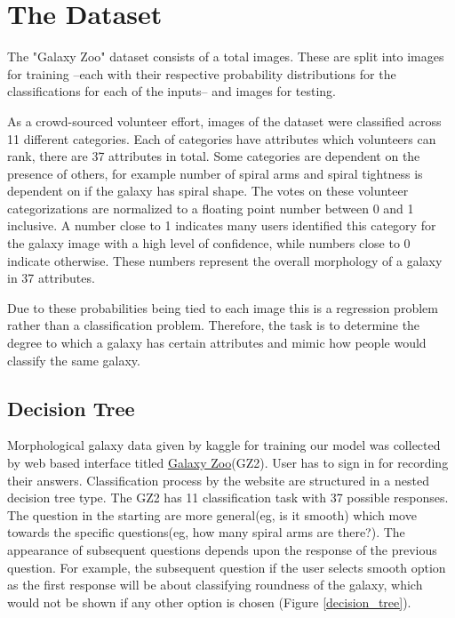 \section{The Dataset}

The "Galaxy Zoo" dataset consists of a total  images. These are split into  images for training --each with their respective probability distributions for the classifications for each of the inputs-- and  images for testing.

As a crowd-sourced volunteer effort, images of the dataset were classified across 11 different categories. Each of categories have attributes which volunteers can rank, there are 37 attributes in total. Some categories are dependent on the presence of others, for example number of spiral arms and spiral tightness is dependent on if the galaxy has spiral shape. The votes on these volunteer categorizations are normalized to a floating point number between 0 and 1 inclusive. A number close to 1 indicates many users identified this category for the galaxy image with a high level of confidence, while numbers close to 0 indicate otherwise. These numbers represent the overall morphology of a galaxy in 37 attributes.

Due to these probabilities being tied to each image this is a regression problem rather than a classification problem. Therefore, the task is to determine the degree to which a galaxy has certain attributes and mimic how people would classify the same galaxy.

\subsection{Decision Tree}

Morphological galaxy data given by kaggle for training our model was collected by web based interface titled \href{https://www.zooniverse.org/projects/zookeeper/galaxy-zoo/classify}{Galaxy Zoo}(GZ2). User has to sign in for recording their answers. Classification process by the website are structured in a nested decision tree type. The GZ2 has 11 classification task with 37 possible responses. The question in the starting are more general(eg, is it smooth) which move towards the specific questions(eg, how many spiral arms are there?). The appearance of subsequent questions depends upon the response of the previous question. For example, the subsequent question if the user selects smooth option as the first response will be about classifying roundness of the galaxy, which would not be shown if any other option is chosen (Figure \ref{decision_tree}).

